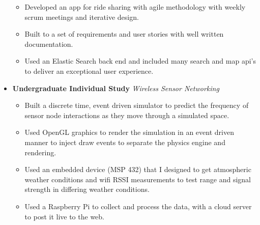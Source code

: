 \documentclass[11pt,a4paper,sans]{moderncv}        %
\begin{document}
\begin{itemize}
{\begin{itemize}
    \item Developed an app for ride sharing with agile methodology with weekly scrum meetings and iterative design.
    \item Built to a set of requirements and user stories with well written documentation.
    \item Used an Elastic Search back end and included many search and map api's to deliver an exceptional user experience.
\end{itemize}
\vspace{6pt}
}

\item{\textbf{Undergraduate Individual Study} \textit{Wireless Sensor Networking}
\vspace{3pt}

\begin{itemize}
    \item Built a discrete time, event driven simulator to predict the frequency of sensor node interactions as they move through a simulated space.
    \item Used OpenGL graphics to render the simulation in an event driven manner to inject draw events to separate the physics engine and rendering.
    \item Used an embedded device (MSP 432) that I designed to get atmospheric weather conditions and wifi RSSI measurements to test range and signal strength in differing weather conditions.
    \item Used a Raspberry Pi to collect and process the data, with a cloud server to post it live to the web.

\end{itemize}
\vspace{6pt}
}


\end{itemize}
\end{document}
